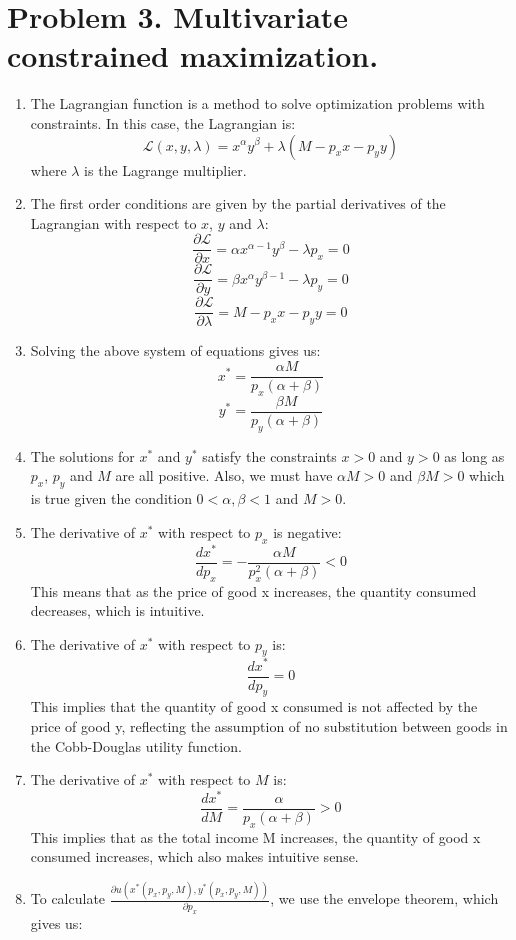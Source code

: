 \documentclass[UTF8,titlepage]{article}
\numberwithin{figure}{section}
\begin{document}
\section{Problem 3. Multivariate constrained maximization.}
\begin{enumerate}
    \item The Lagrangian function is a method to solve optimization problems with constraints. In this case, the Lagrangian is:
    \[\mathcal{L}(x,y,\lambda) = x^{\alpha}y^{\beta} + \lambda(M - p_x x - p_y y)\]
    where $\lambda$ is the Lagrange multiplier.
    \item The first order conditions are given by the partial derivatives of the Lagrangian with respect to $x$, $y$ and $\lambda$:
    \[\frac{\partial \mathcal{L}}{\partial x} = \alpha x^{\alpha - 1}y^{\beta} - \lambda p_x = 0\]
    \[\frac{\partial \mathcal{L}}{\partial y} = \beta x^{\alpha}y^{\beta - 1} - \lambda p_y = 0\]
    \[\frac{\partial \mathcal{L}}{\partial \lambda} = M - p_x x - p_y y = 0\]
    \item Solving the above system of equations gives us:
    \[x^* = \frac{\alpha M}{p_x(\alpha + \beta)}\]
    \[y^* = \frac{\beta M}{p_y(\alpha + \beta)}\]
    \item The solutions for $x^*$ and $y^*$ satisfy the constraints $x > 0$ and $y > 0$ as long as $p_x$, $p_y$ and $M$ are all positive. Also, we must have $\alpha M > 0$ and $\beta M > 0$ which is true given the condition $0 < \alpha, \beta < 1$ and $M > 0$.
    \item The derivative of $x^*$ with respect to $p_x$ is negative:
    \[\frac{dx^*}{dp_x} = -\frac{\alpha M}{p_x^2(\alpha + \beta)} < 0\]
    This means that as the price of good x increases, the quantity consumed decreases, which is intuitive.
    \item The derivative of $x^*$ with respect to $p_y$ is:
    \[\frac{dx^*}{dp_y} = 0\]
    This implies that the quantity of good x consumed is not affected by the price of good y, reflecting the assumption of no substitution between goods in the Cobb-Douglas utility function.
    \item The derivative of $x^*$ with respect to $M$ is:
    \[\frac{dx^*}{dM} = \frac{\alpha}{p_x(\alpha + \beta)} > 0\]
    This implies that as the total income M increases, the quantity of good x consumed increases, which also makes intuitive sense.
    \item To calculate $\frac{\partial u(x^*(p_x, p_y, M), y^*(p_x, p_y, M))}{\partial p_x}$, we use the envelope theorem, which gives us:

\end{enumerate}
\end{document}
